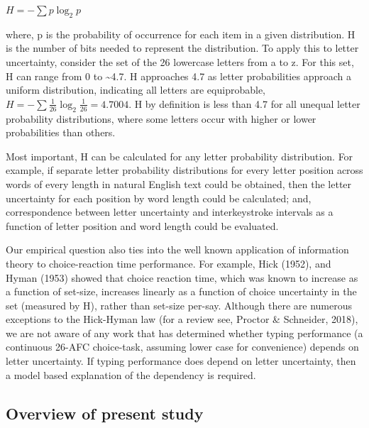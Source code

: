 \documentclass[,man,floatsintext]{apa6}
\begin{document}
\(H = -\sum p \log_2 p\)

where, p is the probability of occurrence for each item in a given distribution. H is the number of bits needed to represent the distribution. To apply this to letter uncertainty, consider the set of the 26 lowercase letters from a to z. For this set, H can range from 0 to \textasciitilde{}4.7. H approaches 4.7 as letter probabilities approach a uniform distribution, indicating all letters are equiprobable, \(H = -\sum \frac{1}{26} \log_2 \frac{1}{26} = 4.7004\). H by definition is less than 4.7 for all unequal letter probability distributions, where some letters occur with higher or lower probabilities than others.

Most important, H can be calculated for any letter probability distribution. For example, if separate letter probability distributions for every letter position across words of every length in natural English text could be obtained, then the letter uncertainty for each position by word length could be calculated; and, correspondence between letter uncertainty and interkeystroke intervals as a function of letter position and word length could be evaluated.

Our empirical question also ties into the well known application of information theory to choice-reaction time performance. For example, Hick (1952), and Hyman (1953) showed that choice reaction time, which was known to increase as a function of set-size, increases linearly as a function of choice uncertainty in the set (measured by H), rather than set-size per-say. Although there are numerous exceptions to the Hick-Hyman law (for a review see, Proctor \& Schneider, 2018), we are not aware of any work that has determined whether typing performance (a continuous 26-AFC choice-task, assuming lower case for convenience) depends on letter uncertainty. If typing performance does depend on letter uncertainty, then a model based explanation of the dependency is required.

\hypertarget{overview-of-present-study}{%
\subsection{Overview of present study}\label{overview-of-present-study}}
\end{document}
